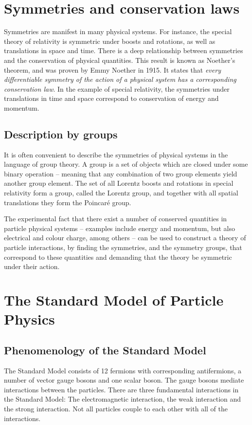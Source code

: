 \documentclass[twoside,english]{uiofysmaster}
\begin{document}
\section{Symmetries and conservation laws}
Symmetries are manifest in many physical systems. For instance, the special theory of relativity is symmetric under boosts and rotations, as well as translations in space and time. There is a deep relationship between symmetries and the conservation of physical quantities. This result is known as Noether's theorem, and was proven by Emmy Noether in 1915. It states that {\it every differentiable symmetry of the action of a physical system has a corresponding conservation law}. In the example of special relativity, the symmetries under translations in time and space correspond to conservation of energy and momentum.%

\subsection{Description by groups}
It is often convenient to describe the symmetries of physical systems in the language of group theory. A group is a set of objects which are closed under some binary operation -- meaning that any combination of two group elements yield another group element. The set of all Lorentz boosts and rotations in special relativity form a group, called the Lorentz group, and together with all spatial translations they form the Poincar\'{e} group. 

The experimental fact that there exist a number of conserved quantities in particle physical systems -- examples include energy and momentum, but also electrical and colour charge, among others -- can be used to construct a theory of particle interactions, by finding the symmetries, and the symmetry groups, that correspond to these quantities and demanding that the theory be symmetric under their action.

\section{The Standard Model of Particle Physics}

\subsection{Phenomenology of the Standard Model}
The Standard Model consists of 12 fermions with corresponding antifermions, a number of vector gauge bosons and one scalar boson. The gauge bosons mediate interactions between the particles. There are three fundamental interactions in the Standard Model: The electromagnetic interaction, the weak interaction and the strong interaction. Not all particles couple to each other with all of the interactions. 
\end{document}
